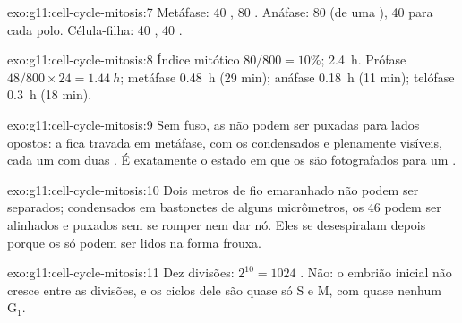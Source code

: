 \begin{solution}{exo:g11:cell-cycle-mitosis:7}
Metáfase: 40 , 80 . Anáfase: 80  (de
uma ), 40 para cada polo. Célula-filha: 40 , 40
.
\end{solution}

\begin{solution}{exo:g11:cell-cycle-mitosis:8}
Índice mitótico $80/800 = 10\%$;  \qty{2.4}{h}. Prófase
$48/800 \times 24 = \qty{1.44}{h}$; metáfase \qty{0.48}{h} (29 min);
anáfase \qty{0.18}{h} (11 min); telófase \qty{0.3}{h} (18 min).
\end{solution}

\begin{solution}{exo:g11:cell-cycle-mitosis:9}
Sem fuso, as  não podem ser puxadas para lados opostos: a
 fica travada em metáfase, com os  condensados e
plenamente visíveis, cada um com duas . É exatamente o estado
em que os  são fotografados para um .
\end{solution}

\begin{solution}{exo:g11:cell-cycle-mitosis:10}
Dois metros de fio emaranhado não podem ser separados; condensados em
bastonetes de alguns micrômetros, os 46  podem ser alinhados
e puxados sem se romper nem dar nó. Eles se desespiralam depois porque
os  só podem ser lidos na forma frouxa.
\end{solution}

\begin{solution}{exo:g11:cell-cycle-mitosis:11}
Dez divisões: $2^{10} = 1024$ . Não: o embrião inicial não
cresce entre as divisões, e os ciclos dele são quase só S e M, com
quase nenhum $\mathrm{G_1}$.
\end{solution}

